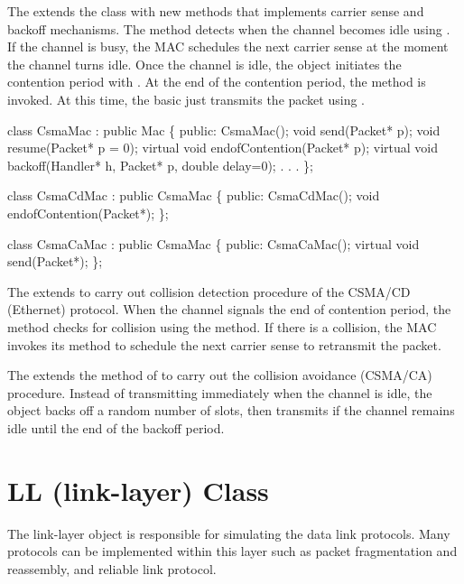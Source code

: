 The  extends the  class
with new methods that implements carrier sense and backoff mechanisms.
The  method detects when the channel becomes idle
using .  If the channel is busy, the MAC
schedules the next carrier sense at the moment the channel turns idle.
Once the channel is idle, the  object initiates the
contention period with .  At the end of the
contention period, the  method is invoked.  At
this time, the basic  just transmits the packet using
.

\begin{program}
    class CsmaMac : public Mac \{
    public:
        CsmaMac();
        void send(Packet* p);
        void resume(Packet* p = 0);
        virtual void endofContention(Packet* p);
        virtual void backoff(Handler* h, Packet* p, double delay=0);
                . . .
    \};

    class CsmaCdMac : public CsmaMac \{
    public:
        CsmaCdMac();
        void endofContention(Packet*);
    \};

    class CsmaCaMac : public CsmaMac \{
    public:
        CsmaCaMac();
        virtual void send(Packet*);
    \};
\end{program}

The  extends  to carry out collision
detection procedure of the CSMA/CD (Ethernet) protocol.  When the
channel signals the end of contention period, the 
method checks for collision using the 
method.  If there is a collision, the MAC invokes its 
method to schedule the next carrier sense to retransmit the packet.

The  extends the  method of  to
carry out the collision avoidance (CSMA/CA) procedure.  Instead of
transmitting immediately when the channel is idle, the 
object backs off a random number of slots, then transmits if the channel
remains idle until the end of the backoff period.

\section{LL (link-layer) Class}
\label{sec:linklayer}

The link-layer object is responsible for simulating the data link
protocols.  Many protocols can be implemented within this layer such
as packet fragmentation and reassembly, and reliable link protocol. 

